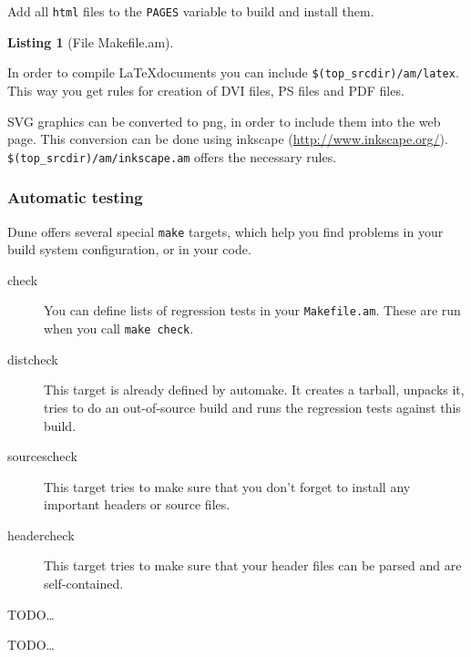 \documentclass[11pt,a4paper,headinclude,footinclude,DIV16,normalheadings]{scrartcl}
\newtheorem{lst}{Listing}
\newcommand{\makefileam}{\texttt{Makefile.am}\xspace}
\newcommand{\make}{\texttt{make}\xspace}
\begin{document}
Add all \texttt{html} files to the \texttt{PAGES} variable to build
and install them.

\hspace*{-2ex}\begin{minipage}{\textwidth}
\begin{lst}[File Makefile.am] \mbox{}

\end{lst}
\end{minipage}

In order to compile \LaTeX documents you can include
\texttt{\$(top\_srcdir)/am/latex}. This way you get rules for creation
of DVI files, PS files and PDF files.

SVG graphics can be converted to png, in order to include them into
the web page. This conversion can be done using inkscape
(\url{http://www.inkscape.org/}).
\texttt{\$(top\_srcdir)/am/inkscape.am} offers the necessary rules.

\subsubsection{Automatic testing}

Dune offers several special \make targets, which help you find problems
in your build system configuration, or in your code.

\begin{description}
\item[check] You can define lists of regression tests in your
  \makefileam. These are run when you call \texttt{make check}.
\item[distcheck] This target is already defined by automake. It
  creates a tarball, unpacks it, tries to do an out-of-source build
  and runs the regression tests against this build.
\item[sourcescheck] This target tries to make sure that you don't
  forget to install any important headers or source files.
\item[headercheck] This target tries to make sure that your header
  files can be parsed and are self-contained.
\end{description}


TODO\dots{}


TODO\dots{}

\end{document}
